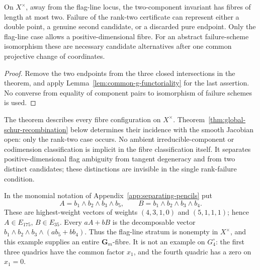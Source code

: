 \begin{corollary}
\label{cor:exceptional-candidate-bound}
On \(X^\times\), away from the flag-line locus, the two-component
invariant has fibres of length at most two.  Failure of the rank-two
certificate can represent either a double point, a genuine second
candidate, or a discarded pure endpoint.  Only the flag-line case
allows a positive-dimensional fibre.  For an abstract failure-scheme
isomorphism these are necessary candidate alternatives after one
common projective change of coordinates.
\end{corollary}
\begin{proof}
Remove the two endpoints from the three closed intersections in the
theorem, and apply Lemma~\ref{lem:common-g-functoriality} for the
last assertion.  No converse from equality of component pairs to
isomorphism of failure schemes is used.
\end{proof}

The theorem describes every fibre configuration on \(X^\times\).
Theorem~\ref{thm:global-schur-recombination} below determines their
incidence with the smooth Jacobian open: only the rank-two case occurs.
No ambient irreducible-component or codimension classification is
implicit in the fibre classification itself.  It separates positive-dimensional flag
ambiguity from tangent degeneracy and from two distinct candidates;
these distinctions are invisible in the single rank-failure condition.

\begin{example}
\label{ex:exceptional-flag-line}
In the monomial notation of Appendix~\ref{app:separating-pencils} put
\[
 A=b_1\wedge b_2\wedge b_3\wedge b_5,\qquad
 B=b_1\wedge b_2\wedge b_3\wedge b_4.
\]
These are highest-weight vectors of weights \((4,3,1,0)\) and
\((5,1,1,1)\); hence \(A\in E_{175}\), \(B\in E_{35}\).
Every \(aA+bB\) is the decomposable vector
\(b_1\wedge b_2\wedge b_3\wedge(ab_5+bb_4)\).
Thus the flag-line stratum is nonempty in \(X^\times\), and this
example supplies an entire \(\mathbf G_m\)-fibre.  It is not an
example on \(G_4^\circ\): the first three quadrics have the common
factor \(x_1\), and the fourth quadric has a zero on \(x_1=0\).
\end{example}
